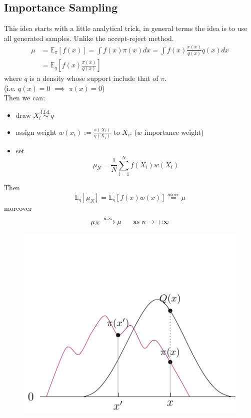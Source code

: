 \documentclass{article}
\begin{document}
\subsection{Importance Sampling}
This idea starts with a little analytical trick, in general terms the idea is to use all generated samples. Unlike the accept-reject method. \\
\begin{equation*}
\begin{split}
    \mu&= \mathbb{E}_{\pi}[f(x)] = \int f(x) \pi(x) dx = \int f(x) \frac{\pi(x)}{q(x)} q(x) dx \\
    &= \mathbb{E}_{q}[f(x)\frac{\pi(x)}{q(x)}]
\end{split}
\end{equation*}
where $q$ is a density whose support include that of $\pi$.\\ (i.e. $q(x)=0$ $\implies$ $\pi(x)=0$)\\
Then we can:
\begin{itemize}
    \item draw $X_i \stackrel{\text{i.i.d.}}{\sim} q$ 
    \item assign weight $w(x_i):= \frac{\pi(X_i)}{q(X_ i)}$ to $X_i$. ($w$ importance weight)
    \item  set 
    \begin{equation*}
        \mu_N= \frac{1}{N} \sum_{i=1}^N f(X_i)w(X_i)
    \end{equation*}
\end{itemize}
Then
\begin{equation*}
    \mathbb{E}_q[\mu_N]= \mathbb{E}_q [f(x)w(x)] \stackrel{above}{=} \mu 
\end{equation*}
moreover
\begin{equation*}
    \mu_N \xrightarrow{a.s.} \mu \hspace{0.5 cm} \text{ as } n \rightarrow + \infty
\end{equation*}
\begin{figure}[H]
    \centering
    \includegraphics{standalones/pdfs/impsamp}
    \label{impsamp}
\end{figure}
\end{document}
